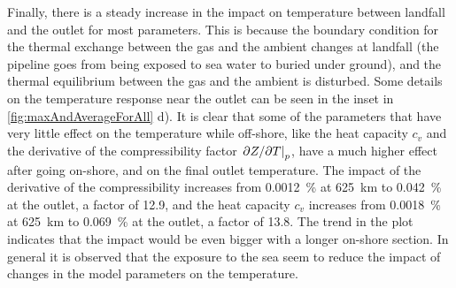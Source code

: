 Finally, there is a steady increase in the impact on temperature between landfall and the outlet for most parameters. This is because the boundary condition for the thermal exchange between the gas and the ambient changes at landfall (the pipeline goes from being exposed to sea water to buried under ground), and the thermal equilibrium between the gas and the ambient is disturbed. %
%
Some details on the temperature response near the outlet can be seen in the inset in \cref{fig:maxAndAverageForAll} d). It is clear that some of the parameters that have very little effect on the temperature while off-shore, like the heat capacity $c_v$ and the derivative of the compressibility factor $\eval{\partial Z/\partial T}_p$, have a much higher effect after going on-shore, and on the final outlet temperature. The impact of the derivative of the compressibility increases from \SI{0.0012}{\percent} at \SI{625}{\kilo\meter} to \SI{0.042}{\percent} at the outlet, a factor of 12.9, and the heat capacity $c_v$ increases from \SI{0.0018}{\percent} at \SI{625}{\kilo\meter} to \SI{0.069}{\percent} at the outlet, a factor of 13.8. The trend in the plot indicates that the impact would be even bigger with a longer on-shore section. In general it is observed that the exposure to the sea seem to reduce the impact of changes in the model parameters on the temperature.



